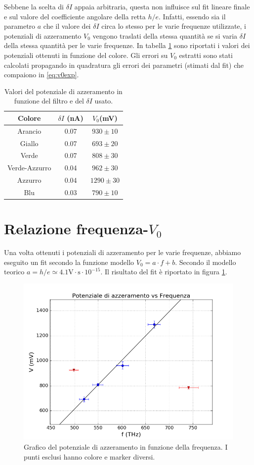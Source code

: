 \documentclass[10pt,a4paper]{article}
\begin{document}
Sebbene la scelta di $\delta I$ appaia arbitraria, questa non influisce sul fit lineare finale e sul valore del coefficiente angolare della retta $h/e$. Infatti, essendo sia il parametro $a$ che il valore dei $\delta I$ circa lo stesso per le varie frequenze utilizzate, i potenziali di azzeramento $V_0$ vengono traslati della stessa quantità se si varia $\delta I$ della stessa quantità per le varie frequenze.
In tabella \ref{tab:V_0} sono riportati i valori dei potenziali ottenuti in funzione del colore. Gli errori su $V_0$ estratti sono stati calcolati propagando in quadratura gli errori dei parametri (stimati dal fit) che compaiono in \ref{eq:v0exp}.
\begin{table}[!htb]
\centering
\begin{tabular}{|c|c|c|}
\hline
Colore & $\delta I$ (nA) & $V_{0}$(mV)\\
\hline
Arancio & 0.07 & $930\pm 10$\\
\hline
Giallo & 0.07 & $693 \pm 20$\\
\hline
Verde & 0.07 & $808 \pm 30$\\
\hline
Verde-Azzurro & 0.04 & $962\pm 30$ \\
\hline
Azzurro & 0.04 & $1290 \pm 30$\\
\hline
Blu & 0.03 & $790 \pm 10$\\
\hline
\end{tabular}
\caption{Valori del potenziale di azzeramento in funzione del filtro e del $\delta I$ usato.\label{tab:V_0}}
\end{table}
\section{Relazione frequenza-$V_0$}
Una volta ottenuti i potenziali di azzeramento per le varie frequenze, abbiamo eseguito un fit secondo la funzione modello $V_0=a\cdot f + b$.
Secondo il modello teorico $a = h/e\simeq 4.1 \mbox{V}\cdot\mbox{s}\cdot10^{-15}$.
Il risultato del fit è riportato in figura \ref{fig:fitfinale}.
\begin{figure}[!htb]
\centering
\includegraphics[scale=0.7]{fitfinale.png}
\caption{Grafico del potenziale di azzeramento in funzione della frequenza. I punti esclusi hanno colore e marker diversi.\label{fig:fitfinale}}
\end{figure}
\end{document}
